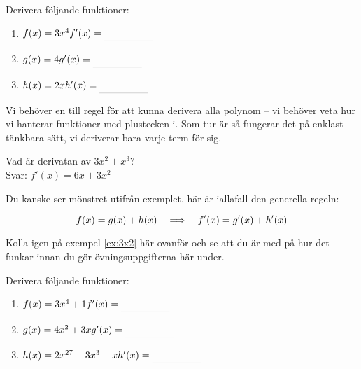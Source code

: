 \documentclass[a4paper, 12pt]{article}
\begin{document}
\begin{uppgifter}
    \label{upp:kx^n}
    Derivera följande funktioner:
    \begin{multicols}{3}
        \begin{enumerate}
            \item $f(x) = 3x^4 \\ f'(x) \ans$
            \item $g(x) = 4 \\ g'(x) \ans$
            \item $h(x) = 2x \\ h'(x) \ans$
        \end{enumerate}
    \end{multicols}
\end{uppgifter}

Vi behöver en till regel för att kunna derivera alla polynom -- vi behöver veta hur vi hanterar funktioner med plustecken i. Som tur är så fungerar det på enklast tänkbara sätt, vi deriverar bara varje term för sig.

\begin{exempel}
    \label{ex:3x2}
    Vad är derivatan av $3x^2 + x^3$? \\ Svar: $f'(x) = 6x + 3x^2$
\end{exempel}

Du kanske ser mönstret utifrån exemplet, här är iallafall den generella regeln:

\begin{regel}
    \label{reg:sum}
    \[ f(x) = g(x) + h(x) \hspace{1em} \Longrightarrow \hspace{1em} f'(x) = g'(x) + h'(x) \] 
\end{regel}

Kolla igen på exempel \ref*{ex:3x2} här ovanför och se att du är med på hur det funkar innan du gör övningsuppgifterna här under.

\begin{uppgifter}
    \label{upp:f+g}
    Derivera följande funktioner:
    \begin{multicols}{3}
        \begin{enumerate}
            \item $f(x) = 3x^4 + 1 \\ f'(x) \ans$
            \item $g(x) = 4x^2 + 3x \\ g'(x) \ans$
            \item $h(x) = 2x^{27} - 3x^3 + x \\ h'(x) \ans$
        \end{enumerate}
    \end{multicols}
\end{uppgifter}
\end{document}

